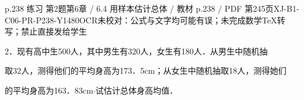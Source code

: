 \begin{bankitem}{p.238 练习 第2题}{第6章 / 6.4 用样本估计总体 / 教材 p.238 / PDF 第245页}{XJ-B1-C06-PR-P238-Y1480}{OCR未校对：公式与文字均可能有误；未完成数学TeX转写；禁止直接发给学生}
\begin{ocrdraft}
\par
2．现有高中生500人，其中男生有320人，女生有180人．从男生中随机抽
\par
取32人，测得他们的平均身高为173．5cm；从女生中随机抽取18人，测得她们
\par
的平均身高为163．83cm\ensuremath{\cdot}试估计总体身高均值．
\end{ocrdraft}
\end{bankitem}
